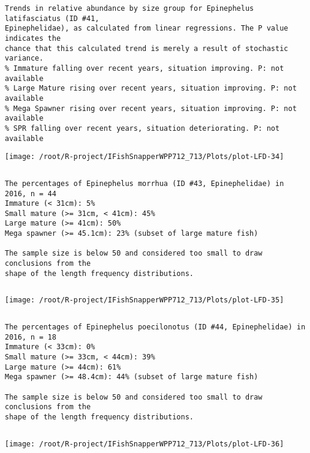 \documentclass{report}\usepackage[]{graphicx}\usepackage[]{color}
\makeatletter
\def\maxwidth{ %
  \ifdim\Gin@nat@width>\linewidth
    \linewidth
  \else
    \Gin@nat@width
  \fi
}
\newenvironment{kframe}{%
 \def\at@end@of@kframe{}%
 \ifinner\ifhmode%
  \def\at@end@of@kframe{\end{minipage}}%
  \begin{minipage}{\columnwidth}%
 \fi\fi%
 \def\FrameCommand##1{\hskip\@totalleftmargin \hskip-\fboxsep
 \colorbox{shadecolor}{##1}\hskip-\fboxsep
     \hskip-\linewidth \hskip-\@totalleftmargin \hskip\columnwidth}%
 \MakeFramed {\advance\hsize-\width
   \@totalleftmargin\z@ \linewidth\hsize
   \@setminipage}}%
 {\par\unskip\endMakeFramed%
 \at@end@of@kframe}
\newenvironment{knitrout}{}{} %
\makeatother
\begin{document}
\begin{knitrout}
\begin{kframe}
\begin{verbatim}
Trends in relative abundance by size group for Epinephelus latifasciatus (ID #41,
Epinephelidae), as calculated from linear regressions. The P value indicates the
chance that this calculated trend is merely a result of stochastic variance.
% Immature falling over recent years, situation improving. P: not available
% Large Mature rising over recent years, situation improving. P: not available
% Mega Spawner rising over recent years, situation improving. P: not available
% SPR falling over recent years, situation deteriorating. P: not available
\end{verbatim}
\end{kframe}
\texttt{[image: /root/R-project/IFishSnapperWPP712\_713/Plots/plot-LFD-34]} 
\begin{kframe}\begin{verbatim}
\end{verbatim}
\end{kframe}
\clearpage
\newpage
\begin{kframe}\begin{verbatim}
The percentages of Epinephelus morrhua (ID #43, Epinephelidae) in 2016, n = 44
Immature (< 31cm): 5%
Small mature (>= 31cm, < 41cm): 45%
Large mature (>= 41cm): 50%
Mega spawner (>= 45.1cm): 23% (subset of large mature fish)
 
The sample size is below 50 and considered too small to draw conclusions from the
shape of the length frequency distributions.
\end{verbatim}
\end{kframe}
\newpage
\begin{kframe}\begin{verbatim}
\end{verbatim}
\end{kframe}
\texttt{[image: /root/R-project/IFishSnapperWPP712\_713/Plots/plot-LFD-35]} 
\begin{kframe}\begin{verbatim}
\end{verbatim}
\end{kframe}
\clearpage
\newpage
\begin{kframe}\begin{verbatim}
The percentages of Epinephelus poecilonotus (ID #44, Epinephelidae) in 2016, n = 18
Immature (< 33cm): 0%
Small mature (>= 33cm, < 44cm): 39%
Large mature (>= 44cm): 61%
Mega spawner (>= 48.4cm): 44% (subset of large mature fish)
 
The sample size is below 50 and considered too small to draw conclusions from the
shape of the length frequency distributions.
\end{verbatim}
\end{kframe}
\newpage
\begin{kframe}\begin{verbatim}
\end{verbatim}
\end{kframe}
\texttt{[image: /root/R-project/IFishSnapperWPP712\_713/Plots/plot-LFD-36]} 


\end{knitrout}
\end{document}
